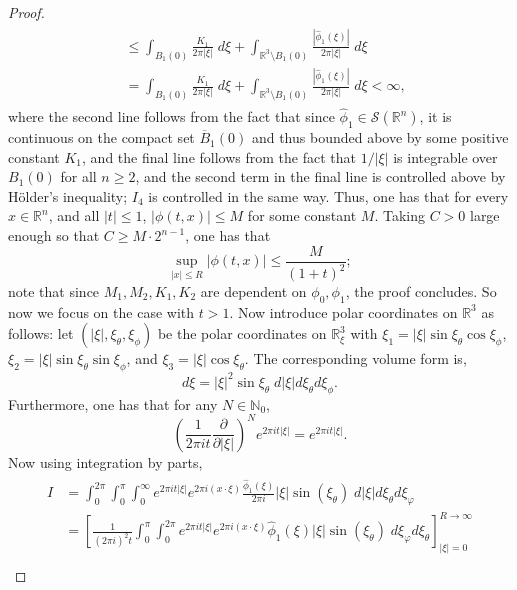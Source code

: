 \documentclass{article}
\begin{document}
\begin{proof}
\begin{align*}
\begin{split}
			&\leq \int_{B_{1}(0)}\frac{K_{1}}{2\pi |\xi|}\;d\xi + \int_{\mathbb{R}^{3}\setminus B_{1}(0)}\frac{|\hat{\phi}_{1}(\xi)|}{2\pi |\xi|}\;d\xi\\
			&= \int_{B_{1}(0)}\frac{K_{1}}{2\pi |\xi|}\;d\xi + \int_{\mathbb{R}^{3}\setminus B_{1}(0)}\frac{|\hat{\phi}_{1}(\xi)|}{2\pi |\xi|}\;d\xi < \infty, 
		\end{split}
	\end{align*}
	where the second line follows from the fact that since $\hat{\phi}_{1} \in \mathcal{S}(\mathbb{R}^{n})$, it is continuous on the compact set $\overline{B}_{1}(0)$ and thus bounded above by some positive constant $K_{1}$, and the final line follows from the fact that $1/|\xi|$ is integrable over $B_{1}(0)$ for all $n \geq 2$, and the second term in the final line is controlled above by H\"older's inequality; $I_{4}$ is controlled in the same way. Thus, one has that for every $x \in \mathbb{R}^{n}$, and all $|t| \leq 1$, $|\phi(t, x)| \leq M$ for some constant $M$. Taking $C > 0$ large enough so that $C \geq M \cdot 2^{n - 1}$, one has that
	\begin{equation*}
		\sup_{|x| \leq R}|\phi(t, x)| \leq \frac{M}{(1 + t)^{2}}; 
	\end{equation*} 
	note that since $M_{1}, M_{2}, K_{1}, K_{2}$ are dependent on $\phi_{0}, \phi_{1}$, the proof concludes. So now we focus on the case with $t > 1$. Now introduce polar coordinates on $\mathbb{R}^{3}$ as follows: let $(|\xi|, \xi_{\theta}, \xi_{\phi})$ be the polar coordinates on $\mathbb{R}^{3}_{\xi}$ with $\xi_{1} = |\xi|\sin{\xi_{\theta}}\cos{\xi_{\phi}}$, $\xi_{2} = |\xi|\sin{\xi_{\theta}}\sin{\xi_{\phi}}$, and $\xi_{3} = |\xi|\cos{\xi_{\theta}}$. The corresponding volume form is, 
	\begin{equation*}
		d\xi = |\xi|^{2}\sin{\xi_{\theta}}\;d|\xi|d\xi_{\theta}d\xi_{\phi}. 
	\end{equation*} 
	Furthermore, one has that for any $N \in \mathbb{N}_{0}$, 
	\begin{equation*}
		\left(\frac{1}{2\pi i t}\frac{\partial}{\partial |\xi|}\right)^{N}e^{2\pi i t|\xi|} = e^{2\pi i t|\xi|}. 
	\end{equation*}
	Now using integration by parts, 
	\begin{align*}
		\begin{split}
			I &= \int_0^{2\pi}\int_0^\pi\int_0^\infty e^{2\pi i t|\xi|} e^{2\pi i (x \cdot \xi)} \frac{\hat{\phi}_1(\xi)}{2\pi i}|\xi|\sin(\xi_\theta)\;d|\xi|d\xi_\theta d\xi_\varphi \\
			&= \left[ \frac{1}{(2\pi i)^2 t}\int_0^{\pi}\int_0^{2\pi}e^{2\pi i t |\xi|}e^{2\pi i (x \cdot \xi)}\hat{\phi}_1(\xi) |\xi| \sin(\xi_\theta)\;d\xi_\varphi d\xi_\theta \right]^{R \to \infty}_{|\xi| = 0} \\

\end{split}
\end{align*}
\end{proof}
\end{document}
